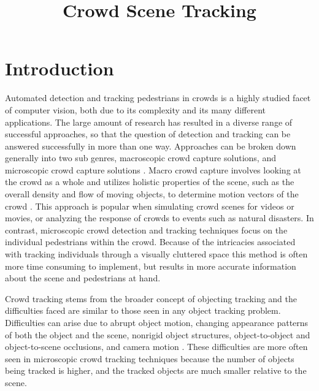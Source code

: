 \documentclass[12pt, twocolumn, conference]{IEEEtran}
\begin{document}
 
\title{Crowd Scene Tracking}

\author{
\and
{}
\and
{}
\and
{}
}

\maketitle

\section{Introduction}

Automated detection and tracking pedestrians in crowds is a highly studied facet of computer vision, both due to its complexity and its many different applications. The large amount of research has resulted in a diverse range of successful approaches, so that the question of detection and tracking can be answered successfully in more than one way. Approaches can be broken down generally into two sub genres, macroscopic crowd capture solutions, and microscopic crowd capture solutions \cite{A. Yilmaz}\cite{M. Thida}. Macro crowd capture involves looking at the crowd as a whole and utilizes holistic properties of the scene, such as the overall density and flow of moving objects, to determine motion vectors of the crowd \cite{M. Thida}. This approach is popular when simulating crowd scenes for videos or movies, or analyzing the response of crowds to events such as natural disasters. In contrast, microscopic crowd detection and tracking techniques focus on the individual pedestrians within the crowd. Because of the intricacies associated with tracking individuals through a visually cluttered space this method is often more time consuming to implement, but results in more accurate information about the scene and pedestrians at hand. 

Crowd tracking stems from the broader concept of objecting tracking and the difficulties faced are similar to those seen in any object tracking problem. Difficulties can arise due to abrupt object motion, changing appearance patterns of both the object and the scene, nonrigid object structures, object-to-object and object-to-scene occlusions, and camera motion \cite{A. Yilmaz}. These difficulties are more often seen in microscopic crowd tracking techniques because the number of objects being tracked is higher, and the tracked objects are much smaller relative to the scene. 
\end{document}
